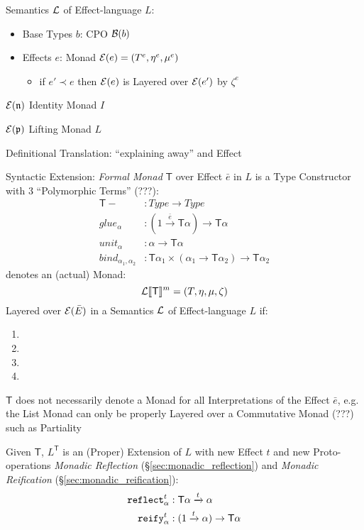Semantics $\mathcal{L}$ of Effect-language $L$:
\begin{itemize}
  \item Base Types $b$: CPO $\mathcal{B}(b)$
  \item Effects $e$: Monad $\mathcal{E}(e) = (T^e,\eta^e,\mu^e)$
    \begin{itemize}
      \item if $e' \prec e$ then $\mathcal{E}(e)$ is Layered over
        $\mathcal{E}(e')$ by $\zeta^e$
    \end{itemize}
\end{itemize}

$\mathcal{E}(\mathfrak{n})$ Identity Monad $I$

$\mathcal{E}(\mathfrak{p})$ Lifting Monad $L$

Definitional Translation: ``explaining away'' and Effect

Syntactic Extension: \emph{Formal Monad} $\mathsf{T}$ over Effect
$\bar{e}$ in $L$ is a Type Constructor with 3 ``Polymorphic Terms''
(???):
\begin{align*}
  \mathsf{T} - &: Type \rightarrow Type \\
  glue_\alpha &: (1 \xrightarrow{\bar{e}} \mathsf{T} \alpha)
    \rightarrow \mathsf{T} \alpha \\
  unit_\alpha &: \alpha \rightarrow \mathsf{T} \alpha \\
  bind_{\alpha_1,\alpha_2} &: \mathsf{T} \alpha_1 \times (\alpha_1
    \rightarrow \mathsf{T} \alpha_2) \rightarrow \mathsf{T} \alpha_2
\end{align*}
denotes an (actual) Monad:
\[
  \mathcal{L}\llbracket \mathsf{T} \rrbracket^m = (T,\eta,\mu,\zeta)
\]
Layered over $\mathcal{E}(\bar{E})$ in a Semantics $\mathcal{L}$ of
Effect-language $L$ if: %
\begin{enumerate}
  \item
  \item
  \item
  \item
\end{enumerate}

\fist $\mathsf{T}$ does not necessarily denote a Monad for all
Interpretations of the Effect $\bar{e}$, e.g. the List Monad can only
be properly Layered over a Commutative Monad (???) such as Partiality

Given $\mathsf{T}$, $L^\mathsf{T}$ is an (Proper) Extension of $L$
with new Effect $t$ and new Proto-operations \emph{Monadic Reflection}
(\S\ref{sec:monadic_reflection}) and \emph{Monadic Reification}
(\S\ref{sec:monadic_reification}):
\begin{align*}
  \mathtt{reflect}_\alpha^t &: \mathsf{T} \alpha \xrightarrow{t} \alpha \\
  \mathtt{reify}_\alpha^t &: (1 \xrightarrow{t} \alpha) \rightarrow
    \mathsf{T} \alpha
\end{align*}

